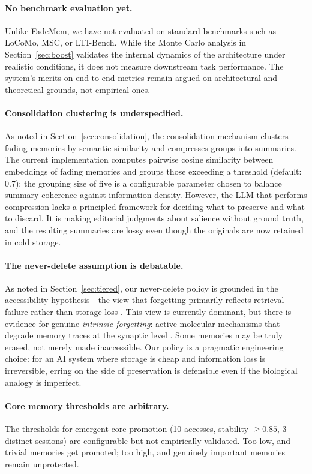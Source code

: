 \documentclass[11pt,a4paper]{article}
\begin{document}
\paragraph{No benchmark evaluation yet.} Unlike FadeMem, we have not evaluated on standard benchmarks such as LoCoMo, MSC, or LTI-Bench. While the Monte Carlo analysis in Section~\ref{sec:boost} validates the internal dynamics of the architecture under realistic conditions, it does not measure downstream task performance. The system's merits on end-to-end metrics remain argued on architectural and theoretical grounds, not empirical ones.

\paragraph{Consolidation clustering is underspecified.} As noted in Section~\ref{sec:consolidation}, the consolidation mechanism clusters fading memories by semantic similarity and compresses groups into summaries. The current implementation computes pairwise cosine similarity between embeddings of fading memories and groups those exceeding a threshold (default: 0.7); the grouping size of five is a configurable parameter chosen to balance summary coherence against information density. However, the LLM that performs compression lacks a principled framework for deciding what to preserve and what to discard. It is making editorial judgments about salience without ground truth, and the resulting summaries are lossy even though the originals are now retained in cold storage.

\paragraph{The never-delete assumption is debatable.} As noted in Section~\ref{sec:tiered}, our never-delete policy is grounded in the accessibility hypothesis---the view that forgetting primarily reflects retrieval failure rather than storage loss \citep{tulving1966availability}. This view is currently dominant, but there is evidence for genuine \emph{intrinsic forgetting}: active molecular mechanisms that degrade memory traces at the synaptic level \citep{davis2017biology}. Some memories may be truly erased, not merely made inaccessible. Our policy is a pragmatic engineering choice: for an AI system where storage is cheap and information loss is irreversible, erring on the side of preservation is defensible even if the biological analogy is imperfect.

\paragraph{Core memory thresholds are arbitrary.} The thresholds for emergent core promotion (10 accesses, stability $\geq 0.85$, 3 distinct sessions) are configurable but not empirically validated. Too low, and trivial memories get promoted; too high, and genuinely important memories remain unprotected.
\end{document}
